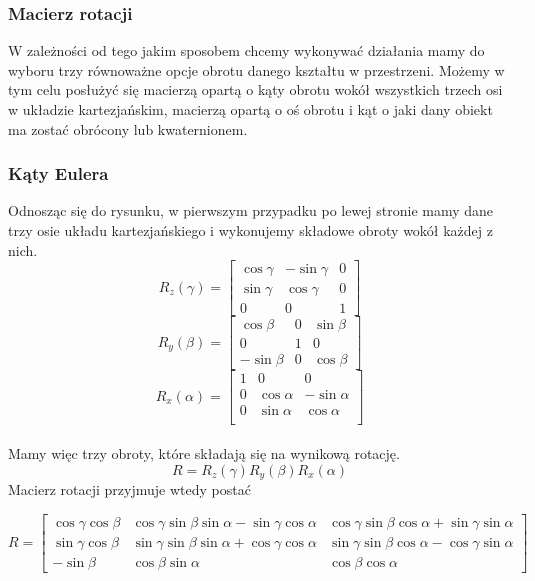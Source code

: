 \documentclass[12pt]{article}
\begin{document}
\subsubsection{Macierz rotacji}
W zależności od tego jakim sposobem chcemy wykonywać działania mamy do wyboru trzy równoważne opcje obrotu danego kształtu w przestrzeni. Możemy w tym celu posłużyć się macierzą opartą o kąty obrotu wokół wszystkich trzech osi w układzie kartezjańskim, macierzą opartą o oś obrotu i kąt o jaki dany obiekt ma zostać obrócony lub kwaternionem.

\subsubsection{Kąty Eulera}
Odnosząc się do rysunku, w pierwszym przypadku po lewej stronie mamy dane trzy osie układu kartezjańskiego i wykonujemy składowe obroty wokół każdej z nich. 
\[
R_{z}(\gamma) = \begin{bmatrix}
\cos \gamma & -\sin \gamma & 0 \\
\sin \gamma & \cos \gamma & 0 \\
0 & 0 & 1
\end{bmatrix}
\]
\[
R_{y}(\beta) = \begin{bmatrix}
\cos \beta & 0 & \sin \beta \\
0 & 1 & 0 \\
-\sin \beta & 0 & \cos \beta
\end{bmatrix}
\]
\[
R_{x}(\alpha) = \begin{bmatrix}
1 & 0 & 0 \\
0 & \cos \alpha & -\sin \alpha \\
0 & \sin \alpha & \cos \alpha \\
\end{bmatrix}
\]
\\
Mamy więc trzy obroty, które składają się na wynikową rotację.
\\
\[R = R_{z}(\gamma)R_{y}(\beta)R_{x}(\alpha)\]
Macierz rotacji przyjmuje wtedy postać

\[
R = \begin{bmatrix}
\cos \gamma \cos \beta & 
\cos \gamma \sin \beta \sin \alpha - \sin \gamma \cos \alpha &
\cos \gamma \sin \beta \cos \alpha + \sin \gamma \sin \alpha \\
\sin \gamma \cos \beta &
\sin \gamma \sin \beta \sin \alpha + \cos \gamma \cos \alpha &
\sin \gamma \sin \beta \cos \alpha - \cos \gamma \sin \alpha \\
-\sin \beta & \cos \beta \sin \alpha & \cos \beta \cos \alpha
\end{bmatrix}
\]
\end{document}
